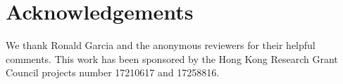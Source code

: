 \section*{Acknowledgements}

We thank Ronald Garcia and the anonymous reviewers for their helpful comments.
This work has been sponsored by the Hong Kong Research Grant Council projects
number 17210617 and 17258816.

